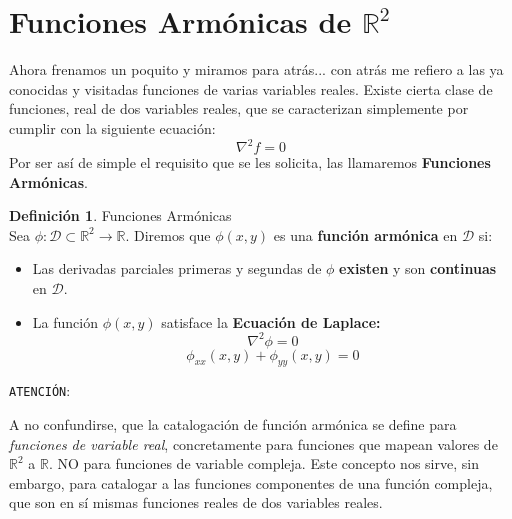 \documentclass[12pt]{article}
\theoremstyle{definition}
\newtheorem{definition}{Definici\'on}[section]
\theoremstyle{theorem}
\theoremstyle{corolary}
\begin{document}
\section{Funciones Arm\'onicas de $\mathbb{R}^2$}
Ahora frenamos un poquito y miramos para atr\'as... con atr\'as me refiero a las ya conocidas y visitadas funciones de varias variables reales. Existe cierta clase de funciones, real de dos variables reales, que se caracterizan simplemente por cumplir con la siguiente ecuaci\'on: $$\nabla^2f=0$$ Por ser as\'i de simple el requisito que se les solicita, las llamaremos \textbf{Funciones Arm\'onicas}.\\

\colorbox{yellow!40!white!80}{\parbox{\linewidth}{
 \theoremstyle{definition}
 \begin{definition}{Funciones Arm\'onicas}\\

  	Sea $\phi: \mathcal{D} \subset \mathbb{R}^2 \rightarrow \mathbb{R}$. Diremos que $\phi(x, y)$ es una \textbf{funci\'on arm\'onica} en $\mathcal{D}$ si:
  	\begin{itemize}
  		\item Las derivadas parciales primeras y segundas de $\phi$ \textbf{existen} y son \textbf{continuas} en $\mathcal{D}$.
  		\item La funci\'on $\phi(x, y)$ satisface la \textbf{Ecuaci\'on de Laplace:} $$\nabla^2 \phi = 0$$ $$\phi_{xx}(x, y) + \phi_{yy}(x, y) = 0$$
  	\end{itemize}
 \end{definition}}}
 \linebreak
 \linebreak


\texttt{ATENCI\'ON}:

A no confundirse, que la catalogaci\'on de funci\'on arm\'onica se define para \textit{funciones de variable real}, concretamente para funciones que mapean valores de $\mathbb{R}^2$ a $\mathbb{R}$. NO para funciones de variable compleja. Este concepto nos sirve, sin embargo, para catalogar a las funciones componentes de una funci\'on compleja, que son en s\'i mismas funciones reales de dos variables reales.
\end{document}
